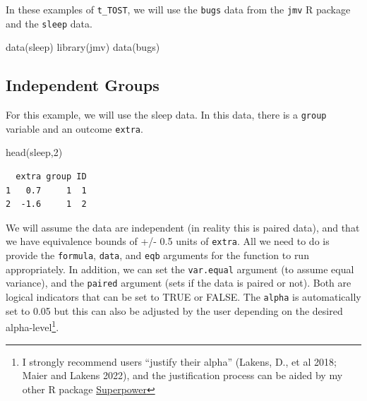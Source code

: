 \documentclass[
]{interact}
\newenvironment{Shaded}{\begin{snugshade}}{\end{snugshade}}
\newcommand{\DecValTok}[1]{\textcolor[rgb]{0.68,0.00,0.00}{#1}}
\newcommand{\FunctionTok}[1]{\textcolor[rgb]{0.28,0.35,0.67}{#1}}
\newcommand{\NormalTok}[1]{\textcolor[rgb]{0.00,0.23,0.31}{#1}}
\newcommand{\StringTok}[1]{\textcolor[rgb]{0.13,0.47,0.30}{#1}}
\begin{document}
\newpage

In these examples of \texttt{t\_TOST}, we will use the \texttt{bugs}
data from the \texttt{jmv} R package and the \texttt{sleep} data.

\begin{Shaded}
\begin{Highlighting}[]
\FunctionTok{data}\NormalTok{(}\StringTok{\textquotesingle{}sleep\textquotesingle{}}\NormalTok{)}
\FunctionTok{library}\NormalTok{(jmv)}
\FunctionTok{data}\NormalTok{(}\StringTok{\textquotesingle{}bugs\textquotesingle{}}\NormalTok{)}
\end{Highlighting}
\end{Shaded}

\hypertarget{independent-groups}{%
\subsection{Independent Groups}\label{independent-groups}}

For this example, we will use the sleep data. In this data, there is a
\texttt{group} variable and an outcome \texttt{extra}.

\begin{Shaded}
\begin{Highlighting}[]
\FunctionTok{head}\NormalTok{(sleep,}\DecValTok{2}\NormalTok{)}
\end{Highlighting}
\end{Shaded}

\begin{verbatim}
  extra group ID
1   0.7     1  1
2  -1.6     1  2
\end{verbatim}

We will assume the data are independent (in reality this is paired
data), and that we have equivalence bounds of +/- 0.5 units of
\texttt{extra}. All we need to do is provide the \texttt{formula},
\texttt{data}, and \texttt{eqb} arguments for the function to run
appropriately. In addition, we can set the \texttt{var.equal} argument
(to assume equal variance), and the \texttt{paired} argument (sets if
the data is paired or not). Both are logical indicators that can be set
to TRUE or FALSE. The \texttt{alpha} is automatically set to 0.05 but
this can also be adjusted by the user depending on the desired
alpha-level\footnote{I strongly recommend users ``justify their alpha''
  (Lakens, D., et al 2018; Maier and Lakens 2022), and the justification
  process can be aided by my other R package
  \href{https://aaroncaldwell.us/Superpower}{Superpower}}.
\end{document}

